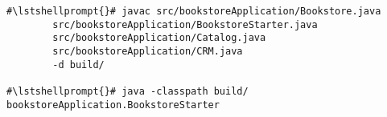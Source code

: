 \begin{lstlisting}[caption=Commands to compile and run the Bookstore application]
#\lstshellprompt{}# javac src/bookstoreApplication/Bookstore.java 
        src/bookstoreApplication/BookstoreStarter.java 
        src/bookstoreApplication/Catalog.java 
        src/bookstoreApplication/CRM.java 
        -d build/

#\lstshellprompt{}# java -classpath build/ bookstoreApplication.BookstoreStarter 
\end{lstlisting}
